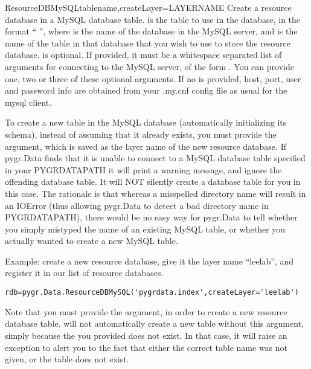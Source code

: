 \documentclass{howto}
\begin{document}
\begin{funcdesc}{ResourceDBMySQL}{tablename,createLayer=LAYERNAME}
  Create a resource database in a MySQL database table.
   is the table to use in the database, in the format
  `` '', where  is the name of the
  database in the MySQL server, and  is the name of
  the table in that database that you wish to use to store the
  resource database.   is optional.
  If provided, it must be a whitespace separated 
  list of arguments for connecting to the MySQL server, of the form
    .  You can provide one, two
  or three of these optional arguments.
  If no  is provided, host, port, user and password info are obtained
  from your .my.cnf config file as usual for the mysql client.

  To create a new table in the MySQL database (automatically initializing its schema),
  instead of assuming that it already exists, you must provide
  the  argument, which is saved as the layer name
  of the new resource database.  If pygr.Data finds that it is unable
  to connect to a MySQL database table specified in your PYGRDATAPATH
  it will print a warning message, and ignore the offending database table.
  It will NOT silently create a database table for you in this case.
  The rationale is that whereas a misspelled directory name will result in
  an IOError (thus allowing pygr.Data to detect a bad directory name in PYGRDATAPATH),
  there would be no easy way for pygr.Data to tell whether you simply mistyped the name
  of an existing MySQL table, or whether you actually wanted to create a new MySQL table.

  Example: create a new resource database, give it the layer name ``leelab'',
  and register it in our list of resource databases.
\begin{verbatim}
rdb=pygr.Data.ResourceDBMySQL('pygrdata.index',createLayer='leelab')
\end{verbatim}
  Note that you must provide the  argument, in order to 
  create a new resource database table.   will not
  automatically create a new table without this argument, simply because the
   you provided does not exist.  In that case, it will
  raise an exception to alert you to the fact that either the correct table name
  was not given, or the table does not exist.
\end{funcdesc}
\end{document}

